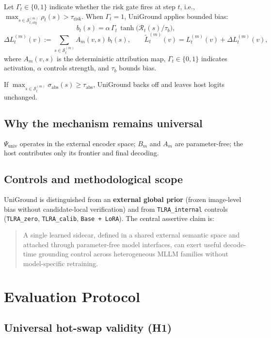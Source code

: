 Let $\Gamma_t \in \{0,1\}$ indicate whether the risk gate fires at step $t$, i.e., $\max_{s \in \mathcal{S}_{t,\mathrm{obj}}^{(m)}} \rho_t(s) > \tau_{\mathrm{risk}}$. When $\Gamma_t=1$, UniGround applies bounded bias:
\[
b_t(s) = \alpha \, \Gamma_t \, \tanh\!\big(\mathcal{R}_t(s) / \tau_b\big),
\]
\[
\Delta L_t^{(m)}(v)
:=
\sum_{s \in \mathcal{S}_t^{(m)}} A_m(v,s)\, b_t(s),
\qquad
\widetilde{L}_t^{(m)}(v) = L_t^{(m)}(v) + \Delta L_t^{(m)}(v),
\]
where $A_m(v,s)$ is the deterministic attribution map, $\Gamma_t \in \{0,1\}$ indicates activation, $\alpha$ controls strength, and $\tau_b$ bounds bias.

If $\max_{s \in \mathcal{S}_t^{(m)}} \sigma_{\mathrm{abs}}(s) \ge \tau_{\mathrm{abs}}$, UniGround backs off and leaves host logits unchanged.

\subsection{Why the mechanism remains universal}

$\Psi_{\mathrm{univ}}$ operates in the external encoder space; $B_m$ and $A_m$ are parameter-free; the host contributes only its frontier and final decoding.

\subsection{Controls and methodological scope}

UniGround is distinguished from an \textbf{external global prior} (frozen image-level bias without candidate-local verification) and from \texttt{TLRA\_internal} controls (\texttt{TLRA\_zero}, \texttt{TLRA\_calib}, \texttt{Base + LoRA}). The central assertive claim is:

\begin{quote}
A single learned sidecar, defined in a shared external semantic space and attached through parameter-free model interfaces, can exert useful decode-time grounding control across heterogeneous MLLM families without model-specific retraining.
\end{quote}

\section{Evaluation Protocol}
\label{sec:eval}

\subsection{Universal hot-swap validity (H1)}

